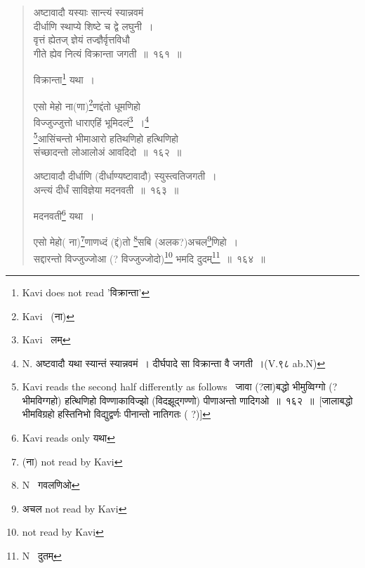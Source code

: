 \documentclass[11pt, openany]{book}
\makeatletter
\newcommand{\devanagarinumeral}[1]{%
	\devanagaridigits{\number \csname c@#1\endcsname}} %
\makeatother
\begin{document}
\fancyhead[CE]{\rule{0.7\linewidth}{0.5pt}}
\fancyhead[CO]{\rule{0.6\linewidth}{0.5pt}}
\fancyhead[LE,RO]{\thepage}
\cfoot{}
\renewcommand{\thepage}{\devanagarinumeral{page}}
\setcounter{page}{328}

\begin{quote}
{\na अष्टावादौ यस्याः सान्त्यं स्यान्नवमं\\
दीर्धाणि स्थाप्ये शिष्टे च द्वे लघुनी~।\\
वृत्तं ह्येतज् ज्ञेयं तज्ज्ञैर्वृत्तविधौ\\
गीते ह्येव नित्यं विक्रान्ता जगती~॥~१६१~॥}

विक्रान्ता\renewcommand{\thefootnote}{1}\footnote{Kavi does not read 'विक्रान्ता'} यथा~।

{\na एसो मेहो ना(णा)\renewcommand{\thefootnote}{2}\footnote{Kavi \textendash\ (ना)}णद्दंतो धूमणिहो \\
विज्जुज्जुत्तो धाराएहिं भूमिदलं\renewcommand{\thefootnote}{3}\footnote{Kavi \textendash\ लम्}~।\renewcommand{\thefootnote}{3a}\footnote{N. अष्टवादौ यथा स्यान्तं स्यान्नवमं~। दीर्घपादे सा विक्रान्ता वै जगती~।(V.९८ ab.N)}\\
\renewcommand{\thefootnote}{4}\footnote{Kavi reads the seconḍ half differently as follows \textendash\ जावा (?ला)बद्धो भीमुव्विग्गो (? भीमविग्गहो) हत्थिणिहो विण्णाकाविज्झो (विदझूद्गण्णो) पीणाअन्तो णादिगओ~॥~१६२~॥~[जालाबद्धो भीमविग्रहो हस्तिनिभो विद्युद्वर्णः पीनान्तो नातिगतः ( ?)]}आसिंचन्तो भीमाआरो हतिथणिहो हत्थिणिहो \\
संच्छादन्तो लोआलोअं आवदिदो~॥~१६२~॥}

{}

{\na अष्टावादौ दीर्धाणि (दीर्धाण्यष्टावादौ) स्युस्त्वतिजगती~।\\
अन्त्यं दीर्धं साविज्ञेया मदनवती~॥~१६३~॥}

मदनवती\renewcommand{\thefootnote}{5}\footnote{Kavi reads only यथा} यथा~।

{\na एसो मेहो( ना)\renewcommand{\thefootnote}{6}\footnote{(ना) not read by Kavi}णाणध्दं (द्दं)तो \renewcommand{\thefootnote}{6a}\footnote{N \textendash\ गवलणिओ}सबि (अलक?)अचल\renewcommand{\thefootnote}{7}\footnote{अचल not read by Kavi}णिहो~।\\
सद्दारन्तो विज्जुज्जोआ (? विज्जुज्जोदो)\renewcommand{\thefootnote}{8}\footnote{not read by Kavi} भमदि दुदम्\renewcommand{\thefootnote}{8a}\footnote{N \textendash\ दुतम्}~॥~१६४~॥

}
\end{quote}
\end{document}
